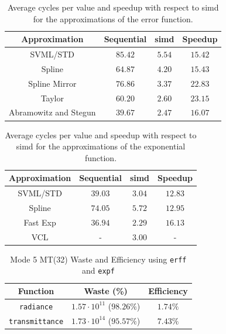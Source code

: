 \documentclass[a4paper, 11pt]{memoir}
\begin{document}
    \begin{table}[ht]
        \centering
        \begin{tabular}{|c|c|c|c|}
            \hline
            Approximation & Sequential & \gls{simd} & Speedup\\\hline
            SVML/STD              & $85.42$ & $5.54$ & $15.42$\\
            Spline                & $64.87$ & $4.20$ & $15.43$\\
            Spline Mirror         & $76.86$ & $3.37$ & $22.83$\\
            Taylor                & $60.20$ & $2.60$ & $23.15$\\
            Abramowitz and Stegun & $39.67$ & $2.47$ & $16.07$\\
            \hline
        \end{tabular}
        \caption{Average cycles per value and speedup with respect to \gls{simd} for the approximations of the error function.}
        \label{tab:abs_cycles_and_speedups_erf}
    \end{table}

    \begin{table}[ht]
        \centering
        \begin{tabular}{|c|c|c|c|}
            \hline
            Approximation & Sequential & \gls{simd} & Speedup\\\hline
            SVML/STD & $39.03$ & $3.04$ & $12.83$\\
            Spline   & $74.05$ & $5.72$ & $12.95$\\
            Fast Exp & $36.94$ & $2.29$ & $16.13$\\
            VCL      & -       & $3.00$ & -\\
            \hline
        \end{tabular}
        \caption{Average cycles per value and speedup with respect to \gls{simd} for the approximations of the exponential function.}
        \label{tab:abs_cycles_and_speedups_exp}
    \end{table}

    \begin{table}[ht]
        \centering
        \begin{tabular}{|c|c|c|}
            \hline
            Function                        & Waste (\%)                       & Efficiency\\\hline
            \texttt{radiance}      & $1.57 \cdot 10^{11}$ ($98.26\%$) & $1.74\%$\\
            \texttt{transmittance} & $1.73 \cdot 10^{14}$ ($95.57\%$) & $7.43\%$ \\
            \hline
        \end{tabular}
        \caption{Mode 5 MT(32) Waste and Efficiency using \texttt{erff} and \texttt{expf}}
        \label{tab:mode_5_mt_wae}
    \end{table}
\end{document}
